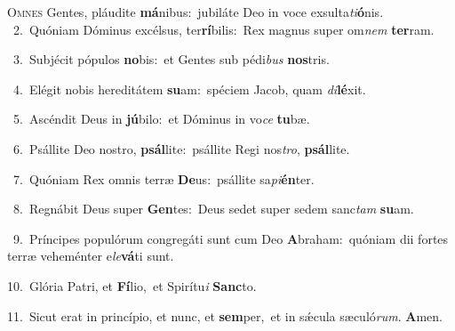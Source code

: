 \lettrine{\initial\textcolor{\initialcolor}{O}}{mnes} Gentes, pláudite \textbf{má}\-nibus:~\star jubiláte Deo in voce exsulta\-\textit{ti}\-\textbf{ó}nis.\\
{\numbfont\textcolor{\numbcolor}{~2.}}~Quóniam Dóminus excélsus, ter\-\textbf{rí}\-bilis:~\star Rex magnus super om\textit{nem} \textbf{ter}\-ram.\par
{\numbfont\textcolor{\numbcolor}{~3.}}~Subjécit pópulos \textbf{no}\-bis:~\star et Gentes sub pédi\textit{bus} \textbf{nos}\-tris.\par
{\numbfont\textcolor{\numbcolor}{~4.}}~Elégit nobis hereditátem \textbf{su}\-am:~\star spéciem Jacob, quam \textit{di}\-\textbf{lé}xit.\par
{\numbfont\textcolor{\numbcolor}{~5.}}~Ascéndit Deus in \textbf{jú}\-bilo:~\star et Dóminus in vo\textit{ce} \textbf{tu}\-bæ.\par
{\numbfont\textcolor{\numbcolor}{~6.}}~Psállite Deo nostro, \textbf{psál}\-lite:~\star psállite Regi nos\-\textit{tro}\-, \textbf{psál}\-lite.\par
{\numbfont\textcolor{\numbcolor}{~7.}}~Quóniam Rex omnis terræ \textbf{De}\-us:~\star psállite sa\-\textit{pi}\-\textbf{én}ter.\par
{\numbfont\textcolor{\numbcolor}{~8.}}~Regnábit Deus super \textbf{Gen}\-tes:~\star Deus sedet super sedem sanc\textit{tam} \textbf{su}\-am.\par
{\numbfont\textcolor{\numbcolor}{~9.}}~Príncipes populórum congregáti sunt cum Deo \textbf{A}\-braham:~\star quóniam dii fortes terræ veheménter e\-\textit{le}\-\textbf{vá}ti sunt.\par
{\numbfont\textcolor{\numbcolor}{10.}}~Glória Patri, et \textbf{Fí}\-lio,~\star et Spirítu\textit{i} \textbf{Sanc}\-to.\par
{\numbfont\textcolor{\numbcolor}{11.}}~Sicut erat in princípio, et nunc, et \textbf{sem}\-per,~\star et in sǽcula sæculó\-\textit{rum}\-. \textbf{A}\-men.\par
